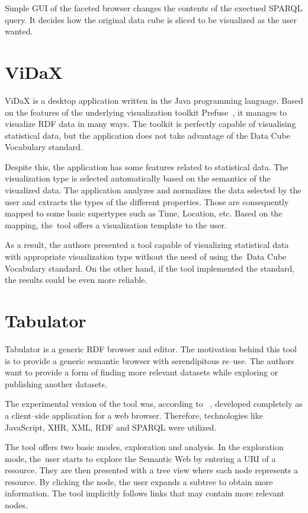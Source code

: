 Simple GUI of the faceted browser changes the contents of the exectued SPARQL query. 
It decides how the original data cube is sliced to be visualized as the user 
wanted.

\section{ViDaX}
ViDaX is a desktop application written in the Java programming language. Based on the features
of the underlying visualization toolkit Prefuse~\cite{prefuse}, it manages to 
visualize RDF data in many ways. The toolkit is perfectly capable of 
visualising statistical data, but the application does not take advantage of the 
Data Cube Vocabulary standard.

Despite this, the application has some features related to statistical 
data. The visualization type is selected automatically based on the semantics of the 
visualized data. The application analyzes and normalizes the data selected by the user 
and extracts the types of the different properties. Those are consequently mapped to 
some basic supertypes such as Time, Location, etc. Based on the mapping,
the~tool offers a visualization template to the user.

As a result, the authors presented a tool capable of visualizing 
statistical data with appropriate visualization type without the need of using 
the~Data Cube Vocabulary standard. On the other hand, if the tool 
implemented the standard, the results could be even more reliable.

\section{Tabulator}
\label{sec:rw:tabulator}
Tabulator is a generic RDF browser and editor. The motivation behind this tool
is to provide a generic semantic browser with serendipitous re--use. The authors 
want to provide a form of finding more relevant datasets while exploring or 
publishing another datasets. 

The experimental version of the tool was, according to ~\cite{tabulator-paper}, 
developed completely as a client--side application for a web browser. Therefore, 
technologies like JavaScript, XHR, XML, RDF and SPARQL were utilized.

The tool offers two basic modes, exploration and analysis. In the exploration mode,
the~user starts to explore the Semantic Web by entering a URI of a resource. They 
are then presented with a tree view where each node represents a resource. 
By clicking the node, the user expands a subtree to obtain more information.
The tool implicitly follows links that may contain more relevant nodes.

